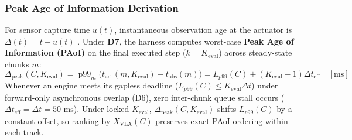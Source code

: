 \documentclass[10pt,letterpaper]{article}
\begin{document}
\subsubsection{Peak Age of Information Derivation}
For sensor capture time $u(t)$, instantaneous observation age at the actuator is $\Delta(t) = t - u(t)$ \cite{Kaul2012realtime}. Under \textbf{D7}, the harness computes worst-case \textbf{Peak Age of Information (PAoI)} \cite{Costa2016age,Yates2021age} on the final executed step ($k = K_{\text{eval}}$) across steady-state chunks $m$:
\begin{equation}
    \Delta_{\text{peak}}(C, K_{\text{eval}}) = \operatorname{p99}_{m}\!\big(t_{\text{act}}(m, K_{\text{eval}}) - t_{\text{obs}}(m)\big) = L_{p99}(C) + (K_{\text{eval}} - 1)\Delta t_{\text{eff}} \quad [\text{ms}]
\end{equation}
Whenever an engine meets its gapless deadline ($L_{p99}(C) \le K_{\text{eval}}\Delta t$) under forward-only asynchronous overlap (D6), zero inter-chunk queue stall occurs ($\Delta t_{\text{eff}} = \Delta t = 50\text{ ms}$). Under locked $K_{\text{eval}}$, $\Delta_{\text{peak}}(C, K_{\text{eval}})$ shifts $L_{p99}(C)$ by a constant offset, so ranking by $X_{\text{VLA}}(C)$ preserves exact PAoI ordering within each track.
\end{document}
